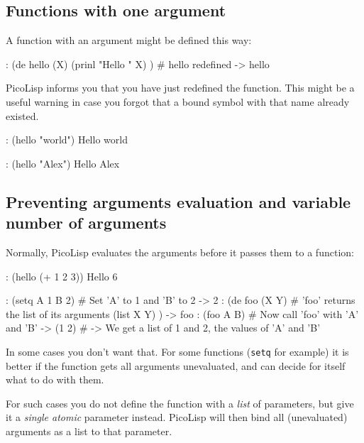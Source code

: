  
\subsection{Functions with one argument}
\label{sec:tut-functions-with-one-argument}


A function with an argument might be defined this way:


\begin{wideverbatim}
: (de hello (X)
   (prinl "Hello " X) )
# hello redefined
-> hello
\end{wideverbatim}

PicoLisp informs you that you have just redefined the function. This
might be a useful warning in case you forgot that a bound symbol with
that name already existed.


\begin{wideverbatim}
: (hello "world")
Hello world
\end{wideverbatim}


\begin{wideverbatim}
: (hello "Alex")
Hello Alex
\end{wideverbatim}

 
\subsection{Preventing arguments evaluation and variable number of arguments}
\label{sec:tut-preventing-arguments-evaluation-and-variable-number-of-arguments}


Normally, PicoLisp evaluates the arguments before it passes them to a
function:


\begin{wideverbatim}
: (hello (+ 1 2 3))
Hello 6
\end{wideverbatim}


\begin{wideverbatim}
: (setq A 1  B 2)       # Set 'A' to 1 and 'B' to 2
-> 2
: (de foo (X Y)         # 'foo' returns the list of its arguments
   (list X Y) )
-> foo
: (foo A B)             # Now call 'foo' with 'A' and 'B'
-> (1 2)                # -> We get a list of 1 and 2, the values of 'A' and 'B'
\end{wideverbatim}

In some cases you don't want that. For some functions (\texttt{setq} for
example) it is better if the function gets all arguments unevaluated,
and can decide for itself what to do with them.

For such cases you do not define the function with a \emph{list} of
parameters, but give it a \emph{single atomic} parameter instead. PicoLisp
will then bind all (unevaluated) arguments as a list to that parameter.


